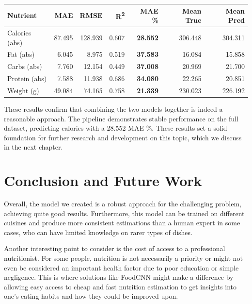 \documentclass[a4paper]{article}
\begin{document}
\vspace{1cm}
\begin{table}[h!]
\centering
{}
\label{tab:performance}
\begin{tabular}{lrrrrrr}
\toprule
\textbf{Nutrient} & \textbf{MAE} & \textbf{RMSE} & \textbf{R\textsuperscript{2}} & \textbf{MAE \%} & \textbf{Mean True} & \textbf{Mean Pred} \\
\midrule
Calories (abs) & 87.495 & 128.939 & 0.607 & \textbf{28.552} & 306.448 & 304.311 \\
Fat (abs) & 6.045 & 8.975 & 0.519 & \textbf{37.583} & 16.084 & 15.858 \\
Carbs (abs) & 7.760 & 12.154 & 0.449 & \textbf{37.008} & 20.969 & 21.700 \\
Protein (abs) & 7.588 & 11.938 & 0.686 & \textbf{34.080} & 22.265 & 20.851 \\
Weight (g) & 49.084 & 74.165 & 0.758 & \textbf{21.339} & 230.023 & 226.192 \\
\bottomrule
\end{tabular}
\end{table}


\vspace{1cm}
\begin{justify}
These results confirm that combining the two models together is indeed a reasonable approach. The pipeline demonstrates stable performance on the full dataset, predicting calories with a 28.552 MAE \%. These results set a solid foundation for further research and development on this topic, which we discuss in the next chapter.
\end{justify}


    \section{Conclusion and Future Work}
    Overall, the model we created is a robust approach for the challenging problem, achieving quite good results. Furthermore, this model can be trained on different cuisines and produce more consistent estimations than a human expert in some cases, who can have limited knowledge on rarer types of dishes.

    Another interesting point to consider is the cost of access to a professional nutritionist. For some people, nutrition is not necessarily a priority or might not even be considered an important health factor due to poor education or simple negligence. This is where solutions like FoodCNN might make a difference by allowing easy access to cheap and fast nutrition estimation to get insights into one's eating habits and how they could be improved upon.
\end{document}
